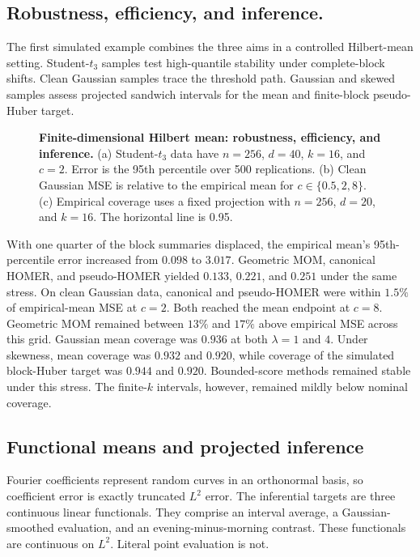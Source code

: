 \documentclass[twoside]{article}
\theoremstyle{definition}
\begin{document}
\subsection{Robustness, efficiency, and inference.}
The first simulated example combines the three aims in a controlled Hilbert-mean setting. Student-$t_3$ samples test high-quantile stability under complete-block shifts. Clean Gaussian samples trace the threshold path. Gaussian and skewed samples assess projected sandwich intervals for the mean and finite-block pseudo-Huber target.

\begin{figure}[t]
\centering
\resizebox{\textwidth}{!}{}
\caption{\textbf{Finite-dimensional Hilbert mean: robustness, efficiency, and inference.}
(a) Student-$t_3$ data have $n=256$, $d=40$, $k=16$, and $c=2$. Error is the 95th percentile over 500 replications. (b) Clean Gaussian MSE is relative to the empirical mean for $c\in\{0.5,2,8\}$. (c) Empirical coverage uses a fixed projection with $n=256$, $d=20$, and $k=16$. The horizontal line is 0.95.}
\label{fig:hilbert-mean-overview}
\end{figure}

With one quarter of the block summaries displaced, the empirical mean's 95th-percentile error increased from $0.098$ to $3.017$. Geometric MOM, canonical HOMER, and pseudo-HOMER yielded $0.133$, $0.221$, and $0.251$ under the same stress. On clean Gaussian data, canonical and pseudo-HOMER were within $1.5\%$ of empirical-mean MSE at $c=2$. Both reached the mean endpoint at $c=8$. Geometric MOM remained between $13\%$ and $17\%$ above empirical MSE across this grid. Gaussian mean coverage was $0.936$ at both $\lambda=1$ and $4$. Under skewness, mean coverage was $0.932$ and $0.920$, while coverage of the simulated block-Huber target was $0.944$ and $0.920$. Bounded-score methods remained stable under this stress. The finite-$k$ intervals, however, remained mildly below nominal coverage.


\subsection{Functional means and projected inference}
Fourier coefficients represent random curves in an orthonormal basis, so coefficient error is exactly truncated $L^2$ error. The inferential targets are three continuous linear functionals. They comprise an interval average, a Gaussian-smoothed evaluation, and an evening-minus-morning contrast. These functionals are continuous on $L^2$. Literal point evaluation is not.
\end{document}
